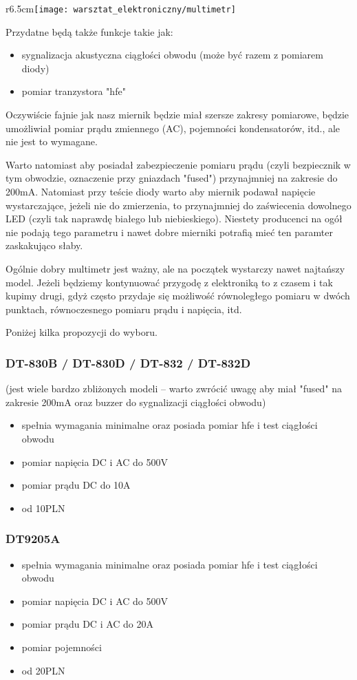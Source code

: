 \documentclass{pdfBooklets}
\newcommand\zaleta{\item[\textbf{\ttfamily +}]}
\newcommand\info{\item[\textbf{\ttfamily *}]}
\begin{document}
	\begin{wrapfigure}{r}{6.5cm}\texttt{[image: warsztat\_elektroniczny/multimetr]}\vspace{-1.2cm}\end{wrapfigure}
	\noindent
	Przydatne będą także funkcje takie jak:
	\begin{itemize}
		\item  sygnalizacja akustyczna ciągłości obwodu (może być razem z pomiarem diody)
		\item pomiar tranzystora "hfe"
	\end{itemize}
	Oczywiście fajnie jak nasz miernik będzie miał szersze zakresy pomiarowe, będzie umożliwiał pomiar prądu zmiennego (AC), pojemności kondensatorów, itd., ale nie jest to wymagane.
	
	Warto natomiast aby posiadał zabezpieczenie pomiaru prądu (czyli bezpiecznik w tym obwodzie, oznaczenie przy gniazdach "fused") przynajmniej na zakresie do 200mA.
	Natomiast przy teście diody warto aby miernik podawał napięcie wystarczające, jeżeli nie do zmierzenia, to przynajmniej do zaświecenia dowolnego LED (czyli tak naprawdę białego lub niebieskiego).
		Niestety producenci na ogół nie podają tego parametru i nawet dobre mierniki potrafią mieć ten paramter zaskakująco słaby.
	
	Ogólnie dobry multimetr jest ważny, ale na początek wystarczy nawet najtańszy model. Jeżeli będziemy kontynuować przygodę z elektroniką to z czasem i tak kupimy drugi, gdyż często przydaje się możliwość równoległego pomiaru w dwóch punktach, równoczesnego pomiaru prądu i napięcia, itd.
	
	Poniżej kilka propozycji do wyboru.
	
	\subsubsection{DT-830B /  DT-830D / DT-832 / DT-832D} (jest wiele bardzo zbliżonych modeli – warto zwrócić uwagę aby miał "fused" na zakresie 200mA oraz buzzer do sygnalizacji ciągłości obwodu)
		\begin{itemize}
			\zaleta spełnia wymagania minimalne oraz posiada pomiar hfe i test ciągłości obwodu
			\zaleta pomiar napięcia DC i AC do 500V
			\zaleta pomiar prądu DC do 10A
			\info od 10PLN
		\end{itemize}

	\subsubsection{DT9205A}
		\begin{itemize}
			\zaleta spełnia wymagania minimalne oraz posiada pomiar hfe i test ciągłości obwodu
			\zaleta pomiar napięcia DC i AC do 500V
			\zaleta pomiar prądu DC i AC do 20A
			\zaleta pomiar pojemności
			\info od 20PLN
		\end{itemize}
	
\end{document}

